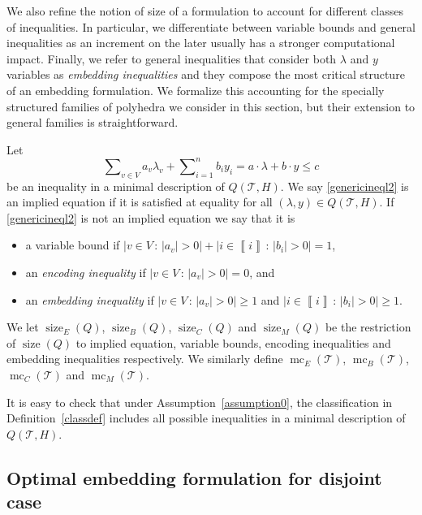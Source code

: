 \documentclass[mnsc]{informs3}
\newcommand{\abs}[1]{\left|#1\right|}                       %
\newcommand{\bra}[1]{\left(#1\right)}
\newcommand{\sidx}[1]{\left\llbracket     #1 \right\rrbracket}
\DeclareMathOperator{\size}{size}
\DeclareMathOperator{\mmc}{mc}
\begin{document}
We also refine the notion of size of a formulation to account for different classes of inequalities. In particular, we differentiate between variable bounds and general inequalities as an increment on the later usually has a stronger computational impact. Finally, we refer to general inequalities that consider both $\lambda$ and $y$ variables as \emph{embedding inequalities} and they compose the most critical structure of an embedding formulation. We formalize this accounting for the specially structured families of polyhedra we consider in this section, but their extension to general families is straightforward. 
\begin{definition}\label{classdef}Let  
\begin{equation}\label{genericineql2}
\sum\nolimits_{v\in V} a_v\lambda_v +\sum\nolimits_{i=1}^n b_i y_i= a\cdot \lambda+b\cdot y\leq c 
\end{equation}
be an inequality in a minimal description of  $ Q\bra{\mathcal{T},H}$. We say \eqref{genericineql2} is an implied equation if it is satisfied at equality for all $\bra{\lambda,y} \in Q\bra{\mathcal{T},H}$. If \eqref{genericineql2} is not an implied equation we say that it is 
\begin{itemize}
\item a variable bound if  $\abs{v\in V\,:\, \abs{a_v}>0}+ \abs{i\in \sidx{i}\,:\, \abs{b_i}>0}=1$, 
\item an \emph{encoding inequality} if   $\abs{v\in V\,:\, \abs{a_v}>0}=0$, and
\item an \emph{embedding inequality} if  $\abs{v\in V\,:\, \abs{a_v}>0}\geq 1$ and $\abs{i\in \sidx{i}\,:\, \abs{b_i}>0}\geq1$.
\end{itemize}
We let $\size_E(Q)$, $\size_B(Q)$, $\size_C(Q)$ and  $\size_M(Q)$  be the restriction of $\size(Q)$ to implied equation, variable bounds, encoding inequalities and embedding inequalities respectively. We similarly define  $\mmc_E\bra{\mathcal{T}}$, $\mmc_B\bra{\mathcal{T}}$, $\mmc_C\bra{\mathcal{T}}$ and $\mmc_M\bra{\mathcal{T}}$.  
\end{definition}
It is easy to check that under Assumption~\ref{assumption0}, the classification in Definition~\ref{classdef} includes all possible inequalities in a minimal description of $ Q\bra{\mathcal{T},H}$.

\subsection{Optimal embedding formulation for disjoint case}
\end{document}
